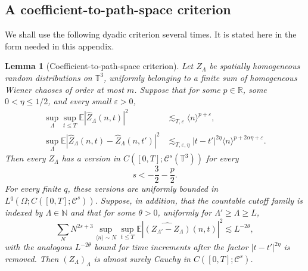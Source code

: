 \documentclass[10pt]{amsart}
\numberwithin{equation}{section}
\theoremstyle{plain}
\newtheorem{lemma}[theorem]{Lemma}
\theoremstyle{definition}
\theoremstyle{remark}
\newcommand{\T}{\mathbb{T}}
\newcommand{\R}{\mathbb{R}}
\newcommand{\E}{\mathbb{E}}
\newcommand{\C}{\mathcal{C}}
\newcommand{\eps}{\varepsilon}
\newcommand{\la}{\langle}
\newcommand{\ra}{\rangle}
\newcommand{\wh}{\widehat}
\begin{document}
\subsection{A coefficient-to-path-space criterion}

We shall use the following dyadic criterion several times.  It is stated here in the form needed in this appendix.

\begin{lemma}[Coefficient-to-path-space criterion]\label{lem:C-coeff-path}
Let \(Z_\Lambda\) be spatially homogeneous random distributions on \(\T^3\), uniformly belonging to a finite sum of homogeneous Wiener chaoses of order at most \(m\).  Suppose that for some \(p\in\R\), some \(0<\eta\le1/2\), and every small \(\eps>0\),
\begin{align}
        \sup_\Lambda\sup_{t\le T}\E|\wh Z_\Lambda(n,t)|^2
        &\lesssim_{T,\eps}\la n\ra^{p+\eps},\label{C:coeff-path-fixed}\\
        \sup_\Lambda\E|\wh Z_\Lambda(n,t)-\wh Z_\Lambda(n,t')|^2
        &\lesssim_{T,\eps,\eta}|t-t'|^{2\eta}\la n\ra^{p+2\alpha\eta+\eps}.
        \label{C:coeff-path-incr}
\end{align}
Then every $Z_\Lambda$ has a version in \(C([0,T];\C^s(\T^3))\) for every
\[
        s<-\frac32-\frac p2.
\]
For every finite $q$, these versions are uniformly bounded in
$L^q(\Omega;C([0,T];\mathcal C^s))$.
Suppose, in addition, that the countable cutoff family is indexed by $\Lambda\in\mathbb N$ and that for some $\theta>0$, uniformly for $\Lambda'\ge\Lambda\ge L$,
\[
        \sum_N N^{2s+3}
        \sup_{\la n\ra\sim N}\sup_{t\le T}
        \E|\widehat{(Z_{\Lambda'}-Z_\Lambda)}(n,t)|^2
        \lesssim L^{-2\theta},
\]
with the analogous $L^{-2\theta}$ bound for time increments after the factor $|t-t'|^{2\eta}$ is removed.  Then \((Z_\Lambda)_\Lambda\) is almost surely Cauchy in \(C([0,T];\C^s)\).
\end{lemma}
\end{document}
